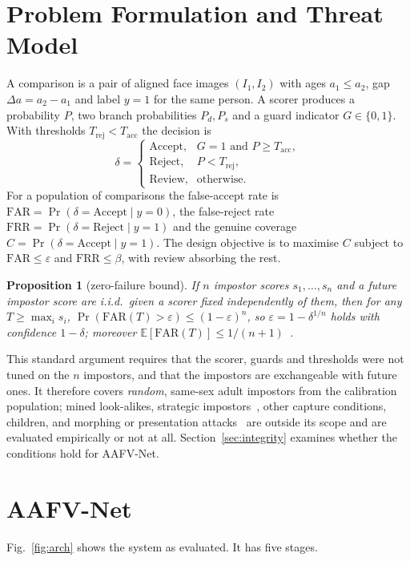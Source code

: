 \documentclass[journal]{IEEEtran}
\newtheorem{proposition}{Proposition}
\begin{document}
\section{Problem Formulation and Threat Model}
\label{sec:problem}
A comparison is a pair of aligned face images $(I_1,I_2)$ with ages $a_1\le a_2$, gap $\Delta a=a_2-a_1$ and label $y=1$ for the same person. A scorer produces a probability $P$, two branch probabilities $P_d,P_s$ and a guard indicator $G\in\{0,1\}$. With thresholds $T_\mathrm{rej}<T_\mathrm{acc}$ the decision is
\begin{equation}
\delta=\begin{cases}\text{Accept}, & G=1 \text{ and } P\ge T_\mathrm{acc},\\ \text{Reject}, & P<T_\mathrm{rej},\\ \text{Review}, & \text{otherwise.}\end{cases}
\label{eq:decision}
\end{equation}
For a population of comparisons the false-accept rate is $\mathrm{FAR}=\Pr(\delta=\text{Accept}\mid y=0)$, the false-reject rate $\mathrm{FRR}=\Pr(\delta=\text{Reject}\mid y=1)$ and the genuine coverage $C=\Pr(\delta=\text{Accept}\mid y=1)$. The design objective is to maximise $C$ subject to $\mathrm{FAR}\le\varepsilon$ and $\mathrm{FRR}\le\beta$, with review absorbing the rest.

\begin{proposition}[zero-failure bound]
If $n$ impostor scores $s_1,\dots,s_n$ and a future impostor score are i.i.d.\ given a scorer fixed independently of them, then for any $T\ge\max_i s_i$, $\Pr(\mathrm{FAR}(T)>\varepsilon)\le(1-\varepsilon)^n$, so $\varepsilon=1-\delta^{1/n}$ holds with confidence $1-\delta$; moreover $\mathbb{E}[\mathrm{FAR}(T)]\le 1/(n+1)$~\cite{vovk2005alrw,clopper1934,hanley1983rule3}.
\end{proposition}
This standard argument requires that the scorer, guards and thresholds were not tuned on the $n$ impostors, and that the impostors are exchangeable with future ones. It therefore covers \emph{random}, same-sex adult impostors from the calibration population; mined look-alikes, strategic impostors~\cite{hu2025neyman}, other capture conditions, children, and morphing or presentation attacks~\cite{scherhag2019morph,iso30107_3} are outside its scope and are evaluated empirically or not at all. Section~\ref{sec:integrity} examines whether the conditions hold for AAFV-Net.

\section{AAFV-Net}
\label{sec:method}
Fig.~\ref{fig:arch} shows the system as evaluated. It has five stages.
\end{document}

